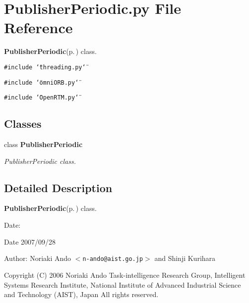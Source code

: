 \section{Publisher\-Periodic.py File Reference}
\label{PublisherPeriodic_8py}
{\bf Publisher\-Periodic}{\rm (p.\,\pageref{classPublisherPeriodic})} class. 

{\tt \#include \char`\"{}threading.py\char`\"{}}\par
{\tt \#include \char`\"{}omni\-ORB.py\char`\"{}}\par
{\tt \#include \char`\"{}Open\-RTM.py\char`\"{}}\par
\subsection*{Classes}
\begin{CompactItemize}
\item 
class {\bf Publisher\-Periodic}
\begin{CompactList}\small\item\em Publisher\-Periodic class. \item\end{CompactList}\end{CompactItemize}


\subsection{Detailed Description}
{\bf Publisher\-Periodic}{\rm (p.\,\pageref{classPublisherPeriodic})} class. 

\begin{Desc}
\item[Date:]\begin{Desc}
\item[Date]2007/09/28 \end{Desc}
\end{Desc}
\begin{Desc}
\item[Author:]Noriaki Ando $<${\tt n-ando@aist.go.jp}$>$ and Shinji Kurihara\end{Desc}
Copyright (C) 2006 Noriaki Ando Task-intelligence Research Group, Intelligent Systems Research Institute, National Institute of Advanced Industrial Science and Technology (AIST), Japan All rights reserved.